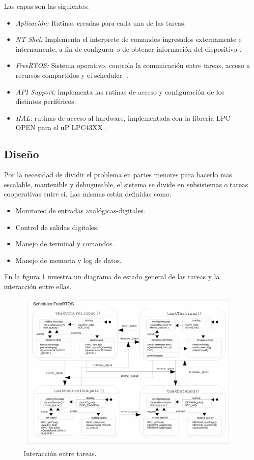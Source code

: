 Las capas son las siguientes: 
\begin{itemize}
\item \emph{Aplicación:} Rutinas creadas para cada una de las tareas.
\item \emph{NT Shel:} Implementa el interprete de comandos ingresados externamente e internamente, a fin de configurar o de obtener información del dispositivo \citep{nt_shell}.
\item \emph{FreeRTOS:} Sistema operativo, controla la comunicación entre tareas, acceso a recursos compartidos y el scheduler. \cite{free_rtos}.
\item \emph{API Support:} implementa las rutinas de acceso y configuración de los distintos periféricos.
\item \emph{HAL:} rutinas de acceso al hardware, implementada con la librería LPC OPEN para el uP LPC43XX \citep{lpcopen}.
\end{itemize}


\subsection{ Diseño }

Por la necesidad de dividir el problema en partes menores para hacerlo mas escalable, mantenible y debugueable, el sistema se divide en subsistemas o tareas cooperativas entre si. Las mismas están definidas como:
\begin{itemize}
	\item Monitoreo de entradas analógicas-digitales.
	\item Control de salidas digitales.
	\item Manejo de terminal y comandos.
	\item Manejo de memoria y log de datos.
\end{itemize}

En la figura \ref{fig:diag_Tareas} muestra un diagrama de estado general de las tareas y la interacción entre ellas.
\begin{figure}[h!]
	\centering
	\includegraphics[width=1.2\textwidth]{Figures/Cap_3/diagrama_tareas}
	\caption{ Interacción entre tareas. }
	\label{fig:diag_Tareas}
\end{figure}

